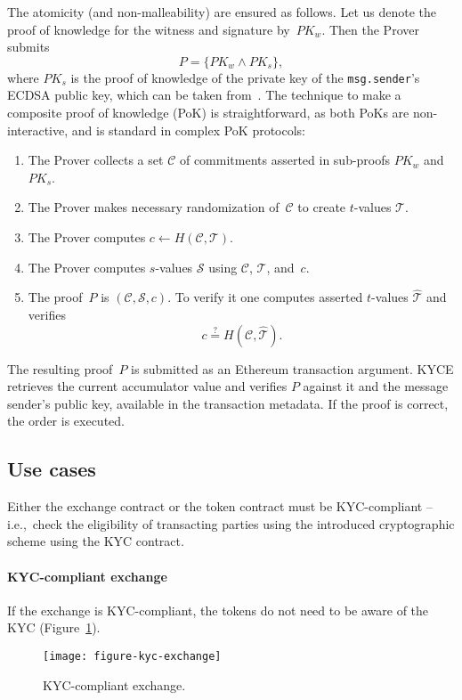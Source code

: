 The atomicity (and non-malleability) are ensured as follows.
Let us denote the proof of knowledge for the witness and signature by~$PK_w$.
Then the Prover submits 
$$
P = \{PK_w \wedge PK_s\},
$$
where $PK_s$ is the proof of knowledge of the private key of the \texttt{msg.sender}'s ECDSA public key, which can be taken from~\cite{Chase2016}.
The technique to make a composite proof of knowledge (PoK) is straightforward, as both PoKs are non-interactive, and is standard in complex PoK protocols:
\begin{enumerate}
	\item The Prover collects a set $\mathcal{C}$ of commitments asserted in sub-proofs $PK_w$ and~$PK_s$.
	\item The Prover makes necessary randomization of~$\mathcal{C}$ to create $t$-values $\mathcal{T}$.
	\item The Prover computes $c \leftarrow H(\mathcal{C},\mathcal{T})$.
	\item The Prover computes $s$-values $\mathcal{S}$ using
	$\mathcal{C}$, $\mathcal{T}$, and~$c$.
	\item The proof~$P$ is $(\mathcal{C}, \mathcal{S},c)$.
	To verify it one computes asserted $t$-values $\widehat{\mathcal{T}}$ and verifies
	$$
	c\overset{?}{=}H(\mathcal{C},\widehat{\mathcal{T}}).
	$$
\end{enumerate}

The resulting proof~$P$ is submitted as an Ethereum transaction argument.
KYCE retrieves the current accumulator value and verifies $P$ against it and the message sender's public key, available in the transaction metadata.
If the proof is correct, the order is executed.


\subsection{Use cases}

Either the exchange contract or the token contract must be KYC-compliant -- i.e.,~check the eligibility of transacting parties using the introduced cryptographic scheme using the KYC contract.

\paragraph{KYC-compliant exchange}

If the exchange is KYC-compliant, the tokens do not need to be aware of the KYC (Figure~\ref{fig:KYCCompliantExchange}).

\begin{figure}[h]
	\centering
	\texttt{[image: figure-kyc-exchange]}
	\caption{KYC-compliant exchange.}
	\label{fig:KYCCompliantExchange}
\end{figure}

